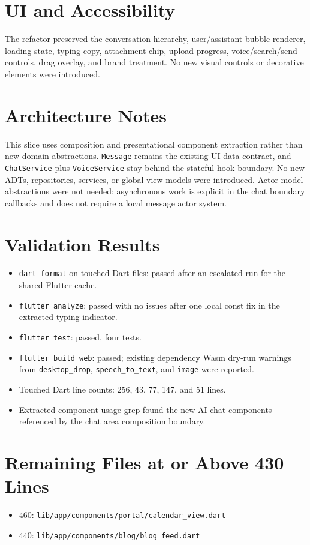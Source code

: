 \documentclass[11pt]{article}
\begin{document}
\section*{UI and Accessibility}
The refactor preserved the conversation hierarchy, user/assistant bubble
renderer, loading state, typing copy, attachment chip, upload progress,
voice/search/send controls, drag overlay, and brand treatment. No new visual
controls or decorative elements were introduced.

\section*{Architecture Notes}
This slice uses composition and presentational component extraction rather than
new domain abstractions. \texttt{Message} remains the existing UI data
contract, and \texttt{ChatService} plus \texttt{VoiceService} stay behind the
stateful hook boundary. No new ADTs, repositories, services, or global view
models were introduced. Actor-model abstractions were not needed: asynchronous
work is explicit in the chat boundary callbacks and does not require a local
message actor system.

\section*{Validation Results}
\begin{itemize}
  \item \texttt{dart format} on touched Dart files: passed after an escalated
  run for the shared Flutter cache.
  \item \texttt{flutter analyze}: passed with no issues after one local const
  fix in the extracted typing indicator.
  \item \texttt{flutter test}: passed, four tests.
  \item \texttt{flutter build web}: passed; existing dependency Wasm dry-run
  warnings from \texttt{desktop\_drop}, \texttt{speech\_to\_text}, and
  \texttt{image} were reported.
  \item Touched Dart line counts: 256, 43, 77, 147, and 51 lines.
  \item Extracted-component usage grep found the new AI chat components
  referenced by the chat area composition boundary.
\end{itemize}

\section*{Remaining Files at or Above 430 Lines}
\begin{itemize}
  \item 460: \texttt{lib/app/components/portal/calendar\_view.dart}
  \item 440: \texttt{lib/app/components/blog/blog\_feed.dart}
\end{itemize}
\end{document}
